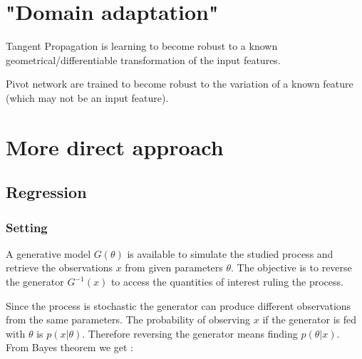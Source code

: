 \section{"Domain adaptation"} %
\label{sec:domain_adaptation}


Tangent Propagation is learning to become robust to a known geometrical/differentiable transformation of the input features.


Pivot network are trained to become robust to the variation of a known feature (which may not be an input feature).


\section{More direct approach} %
\label{sec:more_direct_approach}





\subsection{Regression} %
\label{sub:regression}

\subsubsection{Setting}

A generative model $G(\theta)$ is available to simulate the studied process and retrieve the observations $x$ from given parameters $\theta$.
The objective is to reverse the generator $G^{-1}(x)$ to access the quantities of interest ruling the process.

Since the process is stochastic the generator can produce different observations from the same parameters.
The probability of observing $x$ if the generator is fed with $\theta$ is $p(x | \theta)$.
Therefore reversing the generator means finding $p(\theta | x)$.
From Bayes theorem we get :

